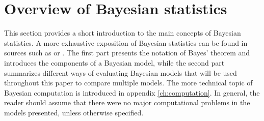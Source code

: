 \section{Overview of Bayesian statistics}

This section provides a short introduction to the main concepts of Bayesian statistics.
A more exhaustive exposition of Bayesian statistics can be found in sources such as \cite{gelman_bayesian_2014} or \cite{mcelreath_statistical_2020}.
The first part presents the notation of Bayes' theorem and introduces the components of a Bayesian model, while the second part summarizes different ways of evaluating Bayesian models that will be used throughout this paper to compare multiple models.
The more technical topic of Bayesian computation is introduced in appendix \ref{ch:computation}.
In general, the reader should assume that there were no major computational problems in the models presented, unless otherwise specified.




